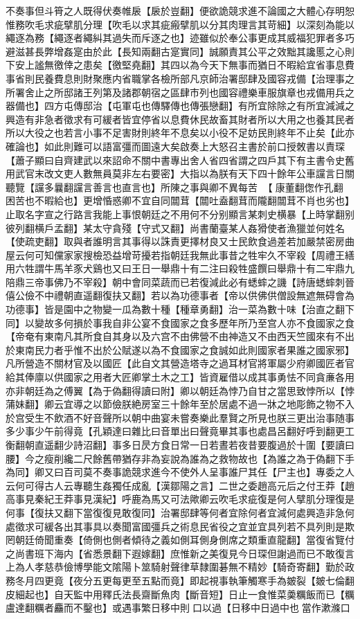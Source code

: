 不奏事但斗筲之人既得伏奏帷扆【扆於豈翻】便欲詭競求進不論國之大體心存明恕惟務吹毛求疵擘肌分理【吹毛以求其疵瘢擘肌以分其肉理言其苛細】以深刻為能以繩逐為務【繩逐者繩糾其過失而斥逐之也】迹雖似於奉公事更成其威福犯罪者多巧避滋甚長弊增姦寔由於此【長知兩翻古寔實同】誠願責其公平之效黜其讒慝之心則下安上謐無徼倖之患矣【徼堅堯翻】其四以為今天下無事而猶日不暇給宜省事息費事省則民養費息則財聚應内省職掌各檢所部凡京師治署邸肆及國容戎備【治理事之所署舍止之所邸諸王列第及諸郡朝宿之區肆市列也國容禮樂車服旗章也戎備用兵之器備也】四方屯傳邸治【屯軍屯也傳驛傳也傳張戀翻】有所宜除除之有所宜減減之興造有非急者徵求有可緩者皆宜停省以息費休民故畜其財者所以大用之也養其民者所以大役之也若言小事不足害財則終年不息矣以小役不足妨民則終年不止矣【此亦確論也】如此則難可以語富彊而圖遠大矣啟奏上大怒召主書於前口授敇書以責琛【蕭子顯曰自齊建武以來詔命不關中書專出舍人省四省謂之四戶其下有主書令史舊用武官末改文吏人數無員莫非左右要密】大指以為朕有天下四十餘年公車讜言日關聽覽【讜多曩翻讜言善言也直言也】所陳之事與卿不異每苦【康董翻偬作孔翻困苦也不暇給也】更增惛惑卿不宜自同闒茸【闒吐盍翻茸而隴翻闒茸不肖也劣也】止取名字宣之行路言我能上事恨朝廷之不用何不分别顯言某刺史横暴【上時掌翻别彼列翻横戶孟翻】某太守貪殘【守式又翻】尚書蘭臺某人姦猾使者漁獵並何姓名【使疏吏翻】取與者誰明言其事得以誅責更擇材良又士民飲食過差若加嚴禁密房曲屋云何可知儻家家搜檢恐益增苛擾若指朝廷我無此事昔之牲牢久不宰殺【周禮王繕用六牲謂牛馬羊豕犬鷄也又曰王日一舉鼎十有二注曰殺牲盛饌曰舉鼎十有二牢鼎九陪鼎三帝事佛乃不宰殺】朝中會同菜蔬而已若復減此必有蟋蟀之譏【詩唐蟋蟀刺晉僖公儉不中禮朝直遥翻復扶又翻】若以為功德事者【帝以供佛供僧設無遮無碍會為功德事】皆是園中之物變一瓜為數十種【種章勇翻】治一菜為數十味【治直之翻下同】以變故多何損於事我自非公宴不食國家之食多歷年所乃至宫人亦不食國家之食【帝奄有東南凡其所食自其身以及六宫不由佛營不由神造又不由西天竺國來有不出於東南民力者乎惟不出於公賦遂以為不食國家之食誠如此則國家者果誰之國家邪】凡所營造不關材官及以國匠【此自文其營造塔寺之過耳材官將軍屬少府卿國匠者官給其俸廪以供國家之用者大匠卿掌土木之工】皆資雇借以成其事勇怯不同貪亷各用亦非朝廷為之傅翼【為于偽翻得讀曰附】卿以朝廷為悖乃自甘之當思致悖所以【悖蒲妹翻】卿云宜導之以節儉朕絶房室三十餘年至於居處不過一牀之地彫飾之物不入於宫受生不飲酒不好音聲所以朝中曲宴未嘗奏樂此羣賢之所見也朕三更出治事随事多少事少午前得竟【孔穎達曰雜比曰音單出曰聲竟畢其事也處昌呂翻好呼到翻更工衡翻朝直遥翻少詩沼翻】事多日昃方食日常一日若晝若夜昔要腹過於十圍【要讀曰腰】今之瘦削纔二尺餘舊帶猶存非為妄說為誰為之救物故也【為誰之為于偽翻下手為同】卿又曰百司莫不奏事詭競求進今不使外人呈事誰尸其任【尸主也】專委之人云何可得古人云專聽生姦獨任成亂【漢鄒陽之言】二世之委趙高元后之付王莽【趙高事見秦紀王莽事見漢紀】呼鹿為馬又可法歟卿云吹毛求疵復是何人擘肌分理復是何事【復扶又翻下當復復見敢復同】治署邸肆等何者宜除何者宜減何處興造非急何處徵求可緩各出其事具以奏聞富國彊兵之術息民省役之宜並宜具列若不具列則是欺罔朝廷倚聞重奏【倚側也側者傾待之義如側耳側身側席之類重直龍翻】當復省覽付之尚書班下海内【省悉景翻下遐嫁翻】庶惟新之美復見今日琛但謝過而已不敢復言上為人孝慈恭儉博學能文隂陽卜筮騎射聲律草隸圍碁無不精妙【騎奇寄翻】勤於政務冬月四更竟【夜分五更每更至五點而竟】即起視事執筆觸寒手為皴裂【皴七倫翻皮細起也】自天監中用釋氏法長齋斷魚肉【斷音短】日止一食惟菜羮糲飯而已【糲盧達翻糲者麤而不鑿也】或遇事繁日移中則口以過【日移中日過中也當作漱滌口